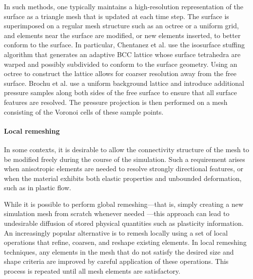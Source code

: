In such methods, one typically maintains a high-resolution representation of the surface as a triangle mesh that is updated at each time step.
The surface is superimposed on a regular mesh structure such as an octree or a uniform grid, and elements near the surface are modified, or new elements inserted, to better conform to the surface.
In particular, Chentanez et al. \cite{Chentanez2007} use the isosurface stuffing algorithm \cite{Labelle2007} that generates an adaptive BCC lattice whose surface tetrahedra are warped and possibly subdivided to conform to the surface geometry.
Using an octree to construct the lattice allows for coarser resolution away from the free surface.
Brochu et al. \cite{Brochu2010} use a uniform background lattice and introduce additional pressure samples along both sides of the free surface to ensure that all surface features are resolved.
The pressure projection is then performed on a mesh consisting of the Voronoi cells of these sample points.

\paragraph*{Local remeshing}
In some contexts, it is desirable to allow the connectivity structure of the mesh to be modified freely during the course of the simulation.
Such a requirement arises when anisotropic elements are needed to resolve strongly directional features, or when the material exhibits both elastic properties and unbounded deformation, such as in plastic flow.

While it is possible to perform global remeshing---that is, simply creating a new simulation mesh from scratch whenever needed \cite{Klingner2006,Bargteil2007}---this approach can lead to undesirable diffusion of stored physical quantities such as plasticity information.
An increasingly popular alternative is to remesh locally using a set of local operations that refine, coarsen, and reshape existing elements.
In local remeshing techniques, any elements in the mesh that do not satisfy the desired size and shape criteria are improved by careful application of these operations.
This process is repeated until all mesh elements are satisfactory.


